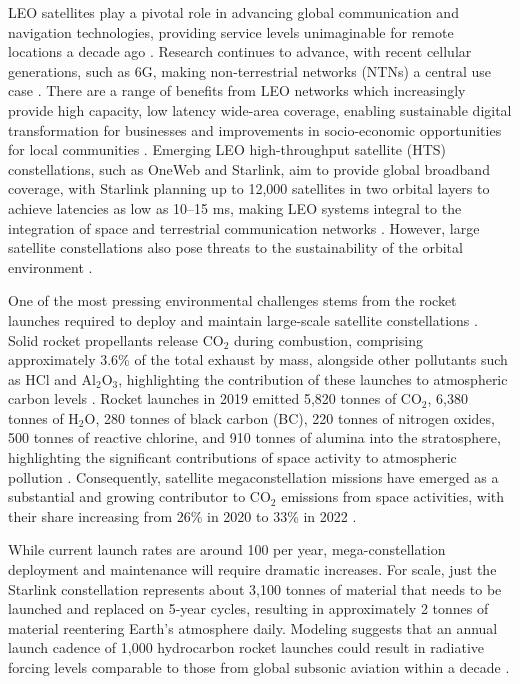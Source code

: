 \documentclass[pdflatex,sn-mathphys-num]{sn-jnl}
\theoremstyle{thmstyleone}%
\theoremstyle{thmstyletwo}%
\theoremstyle{thmstylethree}%
\begin{document}
LEO satellites play a pivotal role in advancing global communication and navigation technologies, providing service levels unimaginable for remote locations a decade ago \citep{ahmmed_digital_2022, reid_broadband_2018}. Research continues to advance, with recent cellular generations, such as 6G, making non-terrestrial networks (NTNs) a central use case \citep{oughton_reviewing_2024, oughton_future_nodate, shahid_emerging_2024}. There are a range of benefits from LEO networks which increasingly provide high capacity, low latency wide-area coverage, enabling sustainable digital transformation for businesses and improvements in socio-economic opportunities for local communities \citep{liao_integration_2023}. Emerging LEO high-throughput satellite (HTS) constellations, such as OneWeb and Starlink, aim to provide global broadband coverage, with Starlink planning up to 12,000 satellites in two orbital layers to achieve latencies as low as 10–15 ms, making LEO systems integral to the integration of space and terrestrial communication networks \citep{su_broadband_2019}. However, large satellite constellations also pose threats to the sustainability of the orbital environment \citep{bastida_virgili_risk_2016, dambrosio_carrying_2024}.

One of the most pressing environmental challenges stems from the rocket launches required to deploy and maintain large-scale satellite constellations \citep{ross_implications_2022}. Solid rocket propellants release CO$_2$ during combustion, comprising approximately 3.6\% of the total exhaust by mass, alongside other pollutants such as HCl and Al$_2$O$_3$, highlighting the contribution of these launches to atmospheric carbon levels \citep{schuch_rocket_nodate}. Rocket launches in 2019 emitted 5,820 tonnes of CO$_2$, 6,380 tonnes of H$_2$O, 280 tonnes of black carbon (BC), 220 tonnes of nitrogen oxides, 500 tonnes of reactive chlorine, and 910 tonnes of alumina into the stratosphere, highlighting the significant contributions of space activity to atmospheric pollution \citep{brown_worldwide_2024}. Consequently, satellite megaconstellation missions have emerged as a substantial and growing contributor to CO$_2$ emissions from space activities, with their share increasing from 26\% in 2020 to 33\% in 2022 \citep{barker_global_2024}.

While current launch rates are around 100 per year, mega-constellation deployment and maintenance will require dramatic increases. For scale, just the Starlink constellation represents about 3,100 tonnes of material that needs to be launched and replaced on 5-year cycles, resulting in approximately 2 tonnes of material reentering Earth's atmosphere daily.  Modeling suggests that an annual launch cadence of 1,000 hydrocarbon rocket launches could result in radiative forcing levels comparable to those from global subsonic aviation within a decade \citep{boley_satellite_2021}.
\end{document}
